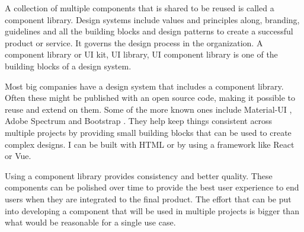 \documentclass{master_thesis}
\begin{document}
A collection of multiple components that is shared to be reused is called a component library. Design systems include values and principles along, branding, guidelines  and all the building blocks and design patterns to create a successful product or service. It governs the design process in the organization. A component library or UI kit, UI library, UI component library is one of the building blocks of a design system. \citep{Ramotion2022}

Most big companies have a design system that includes a component library. Often these might be published with an open source code, making it possible to reuse and extend on them. Some of the more known ones include Material-UI \citep{MUS}, Adobe Spectrum \citep{Adobe} and Bootstrap \citep{Collings}. They help keep things consistent across multiple projects by providing small building blocks that can be used to create complex designs.  I can be built with HTML or by using a framework like React or Vue.

Using a component library provides consistency and better quality. These components can be polished over time to provide the best user experience to end users when they are integrated to the final product. The effort that can be put into developing a component that will be used in multiple projects is bigger than what would be reasonable for a single use case.
\end{document}
